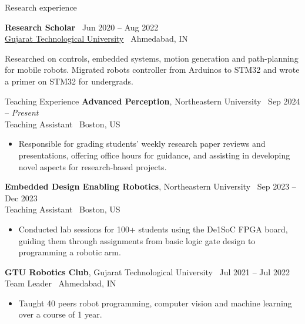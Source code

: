 \documentclass{resume}
\begin{document}
\begin{rSection}{Research experience}
\begin{cvitems}
\end{cvitems}
{\bf Research Scholar} \hfill {\ Jun 2020 -- Aug 2022 }\\ 
{\href{https://www.gtu.ac.in/}{Gujarat Technological University}} \hfill {\ {Ahmedabad, IN}}
\begin{cvitems}
    \item Researched on controls, embedded systems, motion generation and path-planning for mobile robots. Migrated robots controller from Arduinos to STM32 and wrote a primer on STM32 for undergrads.
\end{cvitems}
\end{rSection}


\begin{rSection}{Teaching Experience}
% 
{\bf Advanced Perception}{, Northeastern University} \hfill {\ Sep 2024 -- \textit{Present}}\\
Teaching Assistant \hfill {\ {Boston, US}}
\begin{itemize}
  \item \vspace{-0.5em} Responsible for grading students’ weekly research paper reviews and presentations, offering office hours for guidance, and assisting in developing novel aspects for research-based projects.
 \vspace{-0.3em}
\end{itemize} 
{\bf Embedded Design Enabling Robotics}{, Northeastern University} \hfill {\ Sep 2023 -- Dec 2023}\\
Teaching Assistant \hfill {\ {Boston, US}}
\begin{itemize}
  \item \vspace{-0.5em} Conducted lab sessions for 100+ students using the De1SoC FPGA board, guiding them through assignments from basic logic gate design to programming a robotic arm.
 \vspace{-0.3em}
\end{itemize} 

{\bf GTU Robotics Club}{, Gujarat Technological University} \hfill {\ Jul 2021 -- Jul 2022}\\
Team Leader \hfill {\ {Ahmedabad, IN}}
\begin{itemize}
  \item \vspace{-0.5em} Taught 40 peers robot programming, computer vision and machine learning over a course of 1 year. \vspace{-0.3em}
\end{itemize} 

\end{rSection}
\end{document}
